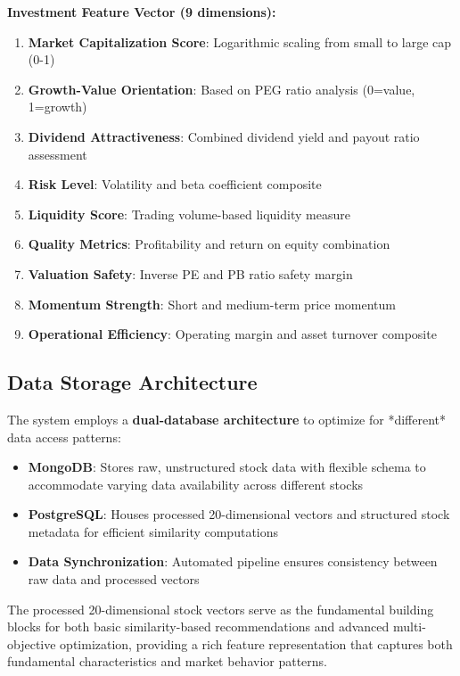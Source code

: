 \textbf{Investment Feature Vector (9 dimensions):}
\begin{enumerate}
    \item \textbf{Market Capitalization Score}: Logarithmic scaling from small to large cap (0-1)
    \item \textbf{Growth-Value Orientation}: Based on PEG ratio analysis (0=value, 1=growth)
    \item \textbf{Dividend Attractiveness}: Combined dividend yield and payout ratio assessment
    \item \textbf{Risk Level}: Volatility and beta coefficient composite
    \item \textbf{Liquidity Score}: Trading volume-based liquidity measure
    \item \textbf{Quality Metrics}: Profitability and return on equity combination
    \item \textbf{Valuation Safety}: Inverse PE and PB ratio safety margin
    \item \textbf{Momentum Strength}: Short and medium-term price momentum
    \item \textbf{Operational Efficiency}: Operating margin and asset turnover composite
\end{enumerate}

\subsection{Data Storage Architecture}
The system employs a \textbf{dual-database architecture} to optimize for *different* data access patterns:

\begin{itemize}
    \item \textbf{MongoDB}: Stores raw, unstructured stock data with flexible schema to accommodate varying data availability across different stocks
    \item \textbf{PostgreSQL}: Houses processed 20-dimensional vectors and structured stock metadata for efficient similarity computations
    \item \textbf{Data Synchronization}: Automated pipeline ensures consistency between raw data and processed vectors
\end{itemize}

The processed 20-dimensional stock vectors serve as the fundamental building blocks for both basic similarity-based recommendations and advanced multi-objective optimization, providing a rich feature representation that captures both fundamental characteristics and market behavior patterns.
